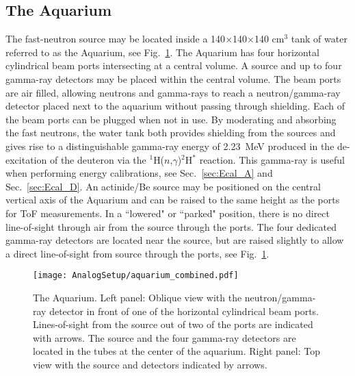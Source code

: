 \documentclass[main.tex]{subfiles}
\begin{document}
\subsection{The Aquarium}
The fast-neutron source may be located inside a 140$\times$140$\times$140 \si{\cm}${}^\text{3}$ tank of water referred to as the Aquarium, see Fig.~\ref{fig:aquarium}. The Aquarium has four horizontal cylindrical beam ports intersecting at a central volume. A source and up to four gamma-ray detectors may be placed within the central volume.  The beam ports are air filled, allowing neutrons and gamma-rays to reach a neutron/gamma-ray detector placed next to the aquarium without passing through shielding. Each of the beam ports can be plugged when not in use.
By moderating and absorbing the fast neutrons, the water tank both provides shielding from the sources and gives rise to a distinguishable gamma-ray energy of \SI{2.23}{MeV} produced in the de-excitation of the deuteron via the $^{\text{1}}$H($n$,$\gamma$)$^{\text{2}}$H$^*$ reaction. This gamma-ray is useful when performing energy calibrations, see Sec.~\ref{sec:Ecal_A} and Sec.~\ref{sec:Ecal_D}. 
An actinide/Be source may be positioned on the central vertical axis of the Aquarium and can be raised to the same height as the ports for ToF measurements. In a ``lowered" or ``parked" position, there is no direct line-of-sight through air from the source through the ports. The four dedicated gamma-ray detectors are located near the source, but are raised slightly to allow a direct line-of-sight from source through the ports, see Fig.~\ref{fig:aquarium}.
\begin{figure}[ht]
	\center
    	\texttt{[image: AnalogSetup/aquarium\_combined.pdf]}
	\caption[The Aquarium.]{The Aquarium. Left panel: Oblique view with the neutron/gamma-ray detector in front of one of the horizontal cylindrical beam ports. Lines-of-sight from the source out of two of the ports are indicated with arrows. The source and the four gamma-ray detectors are located in the tubes at the center of the aquarium. Right panel: Top view with the source and detectors indicated by arrows.}
	\label{fig:aquarium}
\end{figure}
\end{document}
